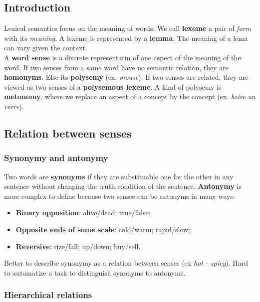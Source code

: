 \subsection{Introduction}

Lexical semantics focus on the meaning of words. We call \textbf{lexeme} a pair of \textit{form} with its \textit{meaning}. A lexeme is represented by a \textbf{lemma}. The meaning of a lema can vary given the context. \\
A \textbf{word sense} is a discrete representatin of one aspect of the meaning of the word. If two senses from a same word have no semantic relation, they are \textbf{homonyms}. Else its \textbf{polysemy} (ex. \textit{mouse}). If two senses are related, they are viewed as two senses of a \textbf{polysemous lexeme}. A kind of polysemy is \textbf{metonomy}, where we replace an aspect of a concept by the concept (ex. \textit{boire un verre}).

\subsection{Relation between senses}

\subsubsection{Synonymy and antonymy}

Two words are \textbf{synonyms} if they are substituable one for the other in any sentence without changing the truth condition of the sentence. \textbf{Antonymy} is more complex to define because two senses can be antonyms in many ways:
\begin{itemize}
 	\item \textbf{Binary opposition}: alive/dead; true/false;
 	\item \textbf{Opposite ends of some scale}: cold/warm; rapid/slow;
 	\item \textbf{Reversive}: rize/fall; up/down; buy/sell.
 \end{itemize} 

 Better to describe synonymy as a relation between senses (ex \textit{hot - spicy}). Hard to automatize a task to distinguish synonyms to antonyms. 

\subsubsection{Hierarchical relations}

